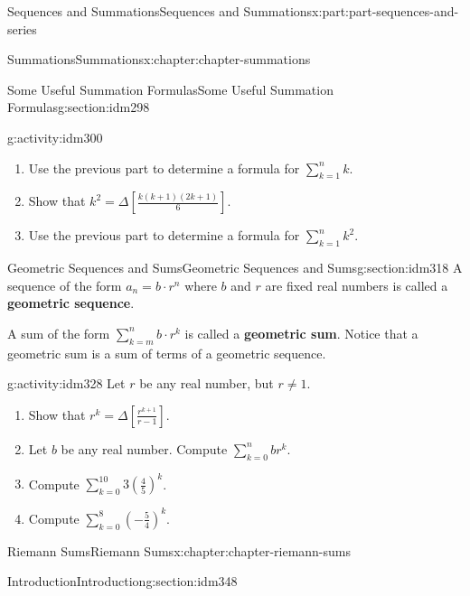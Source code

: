 \documentclass[oneside,10pt,]{book}
\newcommand{\terminology}[1]{\textbf{#1}}
\begin{document}
\begin{partptx}{Sequences and Summations}{}{Sequences and Summations}{}{}{x:part:part-sequences-and-series}
\begin{chapterptx}{Summations}{}{Summations}{}{}{x:chapter:chapter-summations}
\begin{sectionptx}{Some Useful Summation Formulas}{}{Some Useful Summation Formulas}{}{}{g:section:idm298}
\begin{activity}{}{g:activity:idm300}
\begin{enumerate}[font=\bfseries,label=(\alph*),ref=\alph*]
\item{}Use the previous part to determine a formula for \(\displaystyle\sum_{k=1}^n k\).%
\item{}Show that \(k^2 = \Delta \left[ \frac{k(k+1)(2k+1)}{6}\right]\).%
\item{}Use the previous part to determine a formula for \(\displaystyle\sum_{k=1}^n k^2\).%
\end{enumerate}
\end{activity}
\end{sectionptx}
%
%
\typeout{************************************************}
\typeout{************************************************}
%
\begin{sectionptx}{Geometric Sequences and Sums}{}{Geometric Sequences and Sums}{}{}{g:section:idm318}
A sequence of the form \(a_n = b\cdot r^n\) where \(b\) and \(r\) are fixed real numbers is called a \terminology{geometric sequence}.%
\par
A sum of the form \(\displaystyle\sum_{k=m}^n b\cdot r^k\) is called a \terminology{geometric sum}. Notice that a geometric sum is a sum of terms of a geometric sequence.%
\begin{activity}{}{g:activity:idm328}%
Let \(r\) be any real number, but \(r \neq 1\).%
\begin{enumerate}[font=\bfseries,label=(\alph*),ref=\alph*]
\item{}Show that \(\displaystyle r^k = \Delta \left[\frac{r^{k+1}}{r-1}\right]\).%
\item{}Let \(b\) be any real number. Compute \(\displaystyle\sum_{k=0}^n b r^k\).%
\item{}Compute \(\displaystyle\sum_{k=0}^{10} 3 \left(\frac{4}{5}\right)^k\).%
\item{}Compute \(\displaystyle\sum_{k=0}^8  \left(-\frac{5}{4}\right)^k\).%
\end{enumerate}
\end{activity}
\end{sectionptx}
\end{chapterptx}
%
\typeout{************************************************}
\typeout{************************************************}
%
\begin{chapterptx}{Riemann Sums}{}{Riemann Sums}{}{}{x:chapter:chapter-riemann-sums}
%
%
\typeout{************************************************}
\typeout{************************************************}
%
\begin{sectionptx}{Introduction}{}{Introduction}{}{}{g:section:idm348}

\end{sectionptx}
\end{chapterptx}
\end{partptx}
\end{document}
